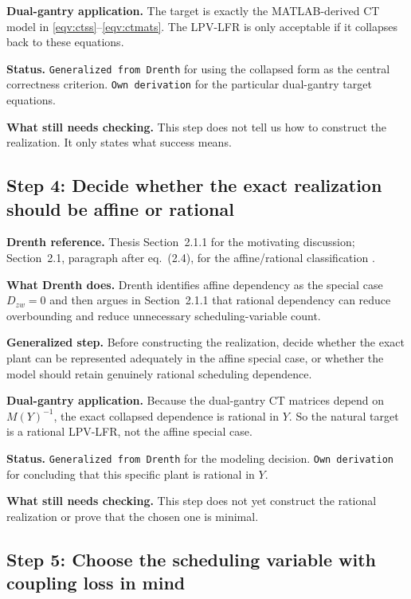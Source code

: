 ﻿\documentclass[11pt]{article}
\newcommand{\audititem}[2]{\par\smallskip\noindent\textbf{#1.} #2\par}
\newcommand{\statusline}[1]{\texttt{#1}}
\begin{document}
\audititem{Dual-gantry application}{The target is exactly the MATLAB-derived CT
model in \eqref{eqv:ctss}--\eqref{eqv:ctmats}. The LPV-LFR is only acceptable if
it collapses back to these equations.}

\audititem{Status}{\statusline{Generalized from Drenth} for using the collapsed
form as the central correctness criterion. \statusline{Own derivation} for the
particular dual-gantry target equations.}

\audititem{What still needs checking}{This step does not tell us how to
construct the realization. It only states what success means.}

\subsection{Step 4: Decide whether the exact realization should be affine or rational}

\audititem{Drenth reference}{Thesis Section~2.1.1 for the motivating discussion;
Section~2.1, paragraph after eq.~(2.4), for the affine/rational classification
\cite{drenth2025thesis}.}

\audititem{What Drenth does}{Drenth identifies affine dependency as the special
case $D_{zw}=0$ and then argues in Section~2.1.1 that rational dependency can
reduce overbounding and reduce unnecessary scheduling-variable count.}

\audititem{Generalized step}{Before constructing the realization, decide whether
the exact plant can be represented adequately in the affine special case, or
whether the model should retain genuinely rational scheduling dependence.}

\audititem{Dual-gantry application}{Because the dual-gantry CT matrices depend
on $M(Y)^{-1}$, the exact collapsed dependence is rational in $Y$. So the
natural target is a rational LPV-LFR, not the affine special case.}

\audititem{Status}{\statusline{Generalized from Drenth} for the modeling
decision. \statusline{Own derivation} for concluding that this specific plant is
rational in $Y$.}

\audititem{What still needs checking}{This step does not yet construct the
rational realization or prove that the chosen one is minimal.}

\subsection{Step 5: Choose the scheduling variable with coupling loss in mind}
\end{document}
